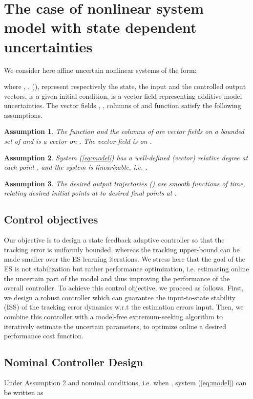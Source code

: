 \documentclass[twoside,leqno,onecolumn]{article}
\newtheorem{assumption}{Assumption}
\begin{document}
\section{The case of nonlinear system model with state dependent
uncertainties}\label{sec:problem} We consider here affine
uncertain nonlinear systems of the form:

where , , 
(), represent respectively the state, the input and the
controlled output vectors,  is a given initial condition,
 is a vector field representing additive model
uncertainties. The vector fields , , columns of 
and function  satisfy the following assumptions.

\begin{assumption}
The function  and the
columns of  are
 vector fields on a bounded set  of
 and  is
a  vector on . The vector field  is  on .
\end{assumption}

\begin{assumption}
System (\ref{eq:model}) has a well-defined (vector) relative
degree  at each point , and
the system is linearizable, i.e. .
\end{assumption}



\begin{assumption}
The desired output trajectories  () are
smooth functions of time, relating desired initial points
 at  to desired final points  at
.
\end{assumption}

\subsection{Control objectives}
Our objective is to design a state feedback adaptive controller so
that the tracking error is uniformly bounded, whereas the tracking
upper-bound can be made smaller over the ES learning iterations.
We stress here that the goal of the ES is not stabilization but
rather performance optimization, i.e. estimating online the
uncertain part of the model and thus improving the performance of
the overall controller. To achieve this control objective, we
proceed as follows. First, we design a robust controller which can
guarantee the input-to-state stability (ISS) of the tracking error
dynamics w.r.t the estimation errors input. Then, we combine this
controller with a model-free extremum-seeking algorithm to
iteratively estimate the uncertain parameters, to optimize online
a desired performance cost function. \subsection{Nominal
Controller Design} \label{sec:norm}
Under Assumption 2 and nominal conditions, i.e. when , system (\ref{eq:model}) can be written as
\end{document}
